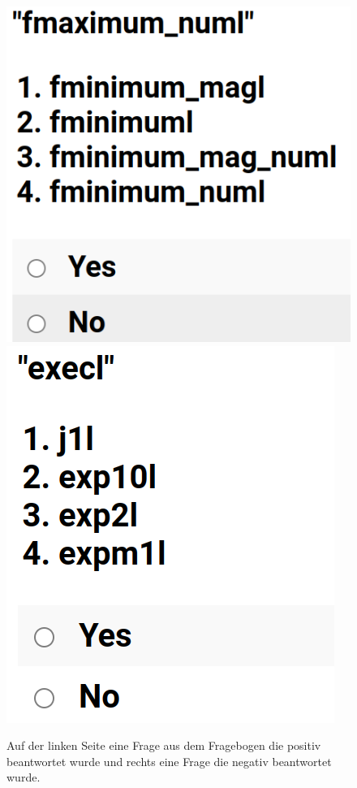 \documentclass[12pt,letterpaper,ngerman]{article}
\begin{document}
\pagebreak

\begin{figure}
  \begin{center}
    \includegraphics[scale=0.3]{abb/survey-example-positive.png}
    \includegraphics[scale=0.3]{abb/survey-example-negative.png}
  \end{center}
  \caption{
    Auf der linken Seite eine Frage aus dem Fragebogen die positiv
    beantwortet wurde und rechts eine Frage die negativ
    beantwortet wurde.
  }
\end{figure}
\end{document}
